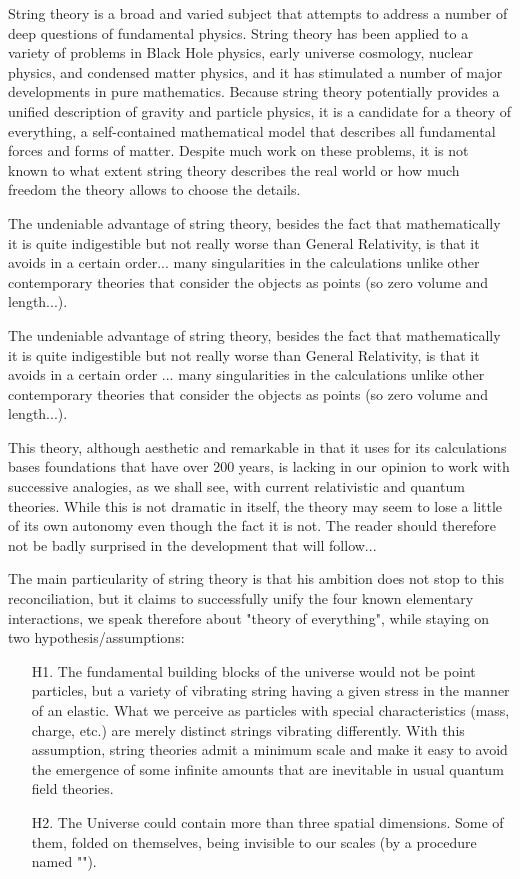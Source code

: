 	String theory is a broad and varied subject that attempts to address a number of deep questions of fundamental physics. String theory has been applied to a variety of problems in Black Hole physics, early universe cosmology, nuclear physics, and condensed matter physics, and it has stimulated a number of major developments in pure mathematics. Because string theory potentially provides a unified description of gravity and particle physics, it is a candidate for a theory of everything, a self-contained mathematical model that describes all fundamental forces and forms of matter. Despite much work on these problems, it is not known to what extent string theory describes the real world or how much freedom the theory allows to choose the details.
	
	The undeniable advantage of string theory, besides the fact that mathematically it is quite indigestible but not really worse than General Relativity, is that it avoids in a certain order... many singularities in the calculations unlike other contemporary theories that consider the objects as points (so zero volume and length...).
	
	The undeniable advantage of string theory, besides the fact that mathematically it is quite indigestible but not really worse than General Relativity, is that it avoids in a certain order ... many singularities in the calculations unlike other contemporary theories that consider the objects as points (so zero volume and length...).
	
	This theory, although aesthetic and remarkable in that it uses for its calculations bases foundations that have over 200 years, is lacking in our opinion to work with successive analogies, as we shall see, with current relativistic and quantum theories. While this is not dramatic in itself, the theory may seem to lose a little of its own autonomy even though the fact it is not. The reader should therefore not be badly surprised in the development that will follow...
	
	The main particularity of string theory is that his ambition does not stop to this reconciliation, but it claims to successfully unify the four known elementary interactions, we speak therefore about "theory of everything", while staying on two hypothesis/assumptions:
	
	\begin{enumerate}
		\item[H1.] The fundamental building blocks of the universe would not be point particles, but a variety of vibrating string having a given stress in the manner of an elastic. What we perceive as particles with special characteristics (mass, charge, etc.) are merely distinct strings vibrating differently. With this assumption, string theories admit a minimum scale and make it easy to avoid the emergence of some infinite amounts that are inevitable in usual quantum field theories.
		\item[H2.] The Universe could contain more than three spatial dimensions. Some of them, folded on themselves, being invisible to our scales (by a procedure named "").
	\end{enumerate}
	
